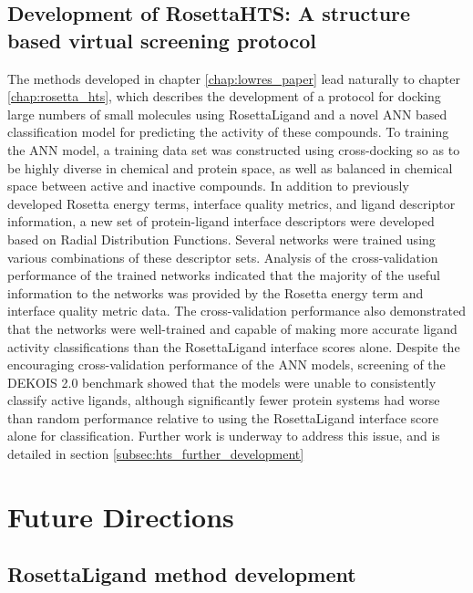\subsection{Development of RosettaHTS: A structure based virtual screening protocol}
The methods developed in chapter \ref{chap:lowres_paper} lead naturally to chapter \ref{chap:rosetta_hts}, which describes the development of a protocol for docking large numbers of small molecules using RosettaLigand and a novel \ac{ANN} based classification model for predicting the activity of these compounds.
To training the \ac{ANN} model, a training data set was constructed using cross-docking so as to be highly diverse in chemical and protein space, as well as balanced in chemical space between active and inactive compounds.
In addition to previously developed Rosetta energy terms, interface quality metrics, and ligand descriptor information, a new set of protein-ligand interface descriptors were developed based on Radial Distribution Functions.
Several networks were trained using various combinations of these descriptor sets.
Analysis of the cross-validation performance of the trained networks indicated that the majority of the useful information to the networks was provided by the Rosetta energy term and interface quality metric data.
The cross-validation performance also demonstrated that the networks were well-trained and capable of making more accurate ligand activity classifications than the RosettaLigand interface scores alone. 
Despite the encouraging cross-validation performance of the \ac{ANN} models, screening of the DEKOIS 2.0 benchmark showed that the models were unable to consistently classify active ligands, although significantly fewer protein systems had worse than random performance relative to using the RosettaLigand interface score alone for classification.
Further work is underway to address this issue, and is detailed in section \ref{subsec:hts_further_development}

\section{Future Directions}

\subsection{RosettaLigand method development}

